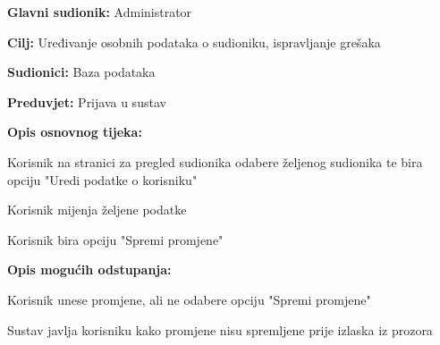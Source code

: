 					\noindent {}
					\begin{packed_item}
						\item \textbf{Glavni sudionik:} Administrator
						\item \textbf{Cilj:} Uređivanje osobnih podataka o sudioniku, ispravljanje grešaka
						\item \textbf{Sudionici:} Baza podataka
						\item \textbf{Preduvjet:} Prijava u sustav
						
						\item \textbf{Opis osnovnog tijeka:} 
						\item[] \begin{packed_enum}
							\item Korisnik na stranici za pregled sudionika odabere željenog sudionika te bira opciju "Uredi podatke o korisniku"
							\item Korisnik mijenja željene podatke
							\item Korisnik bira opciju "Spremi promjene"
						\end{packed_enum}
					
						\item \textbf{Opis mogućih odstupanja:}
						\item[] \begin{packed_enum}

							\item[2.a] Korisnik unese promjene, ali ne odabere opciju "Spremi promjene"
							\item[] \begin{packed_enum}
								\item[1.] Sustav javlja korisniku kako promjene nisu spremljene prije izlaska iz prozora
							\end{packed_enum}
						\end{packed_enum}
					\end{packed_item}

